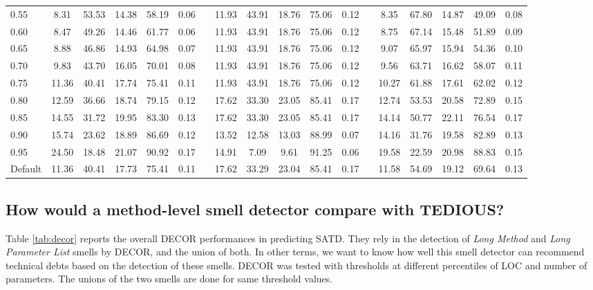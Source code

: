 \begin{landscape}
\begin{table*}[t]
\begin{adjustbox}{center}
\begin{tabular}{lccccclccccclccccc}
				0.55 & 8.31 & 53.53 & 14.38 & 58.19 & 0.06 &  & 11.93 & 43.91 & 18.76 & 75.06 & 0.12 &  & 8.35 & 67.80 & 14.87 & 49.09 & 0.08\\
				0.60 & 8.47 & 49.26 & 14.46 & 61.77 & 0.06 &  & 11.93 & 43.91 & 18.76 & 75.06 & 0.12 &  & 8.75 & 67.14 & 15.48 & 51.89 & 0.09\\
				0.65 & 8.88 & 46.86 & 14.93 & 64.98 & 0.07 &  & 11.93 & 43.91 & 18.76 & 75.06 & 0.12 &  & 9.07 & 65.97 & 15.94 & 54.36 & 0.10\\
				0.70 & 9.83 & 43.70 & 16.05 & 70.01 & 0.08 &  & 11.93 & 43.91 & 18.76 & 75.06 & 0.12 &  & 9.56 & 63.71 & 16.62 & 58.07 & 0.11\\
				0.75 & 11.36 & 40.41 & 17.74 & 75.41 & 0.11 &  & 11.93 & 43.91 & 18.76 & 75.06 & 0.12 &  & 10.27 & 61.88 & 17.61 & 62.02 & 0.12\\
				0.80 & 12.59 & 36.66 & 18.74 & 79.15 & 0.12 &  & 17.62 & 33.30 & 23.05 & 85.41 & 0.17 &  & 12.74 & 53.53 & 20.58 & 72.89 & 0.15\\
				0.85 & 14.55 & 31.72 & 19.95 & 83.30 & 0.13 &  & 17.62 & 33.30 & 23.05 & 85.41 & 0.17 &  & 14.14 & 50.77 & 22.11 & 76.54 & 0.17\\
				0.90 & 15.74 & 23.62 & 18.89 & 86.69 & 0.12 &  & 13.52 & 12.58 & 13.03 & 88.99 & 0.07 &  & 14.16 & 31.76 & 19.58 & 82.89 & 0.13\\
				0.95 & 24.50 & 18.48 & 21.07 & 90.92 & 0.17 &  & 14.91 & 7.09 & 9.61 & 91.25 & 0.06 &  & 19.58 & 22.59 & 20.98 & 88.83 & 0.15\\
				\hline
				Default & 11.36 & 40.41 & 17.73 & 75.41 & 0.11 & &  17.62 & 33.29 & 23.04 & 85.41 & 0.17 & & 11.58 & 54.69 & 19.12 & 69.64 & 0.13\\
				\hline
			\end{tabular}
		\end{adjustbox}
	\vspace{-3mm}
\end{table*}
\end{landscape}

\subsection{How would a method-level smell detector compare with TEDIOUS?}


Table \ref{tab:decor} reports the overall DECOR performances in predicting SATD. They rely in the detection of \textit{Long Method} and \textit{Long Parameter List} smells by DECOR, and the union of both. In other terms, we want to know how well this smell detector can recommend technical debts based on the detection of these smells. DECOR was tested with thresholds at different percentiles of LOC and number of parameters. The unions of the two smells are done for same threshold values.

